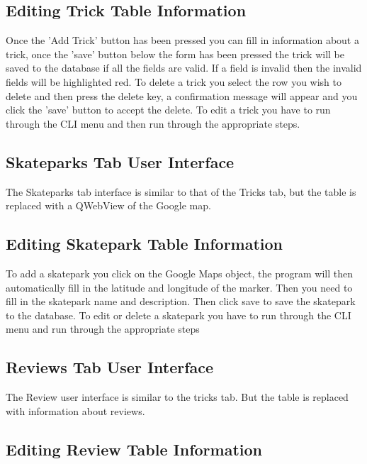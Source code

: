 \subsection{Editing Trick Table Information}

Once the 'Add Trick' button has been pressed you can fill in information about a trick, once the 'save' button below the form has been pressed the trick will be saved to the database if all the fields are valid. If a field is invalid then the invalid fields will be highlighted red. To delete a trick you select the row you wish to delete and then press the delete key, a confirmation message will appear and you click the 'save' button to accept the delete. To edit a trick you have to run through the CLI menu and then run through the appropriate steps.



\subsection{Skateparks Tab User Interface}

The Skateparks tab interface is similar to that of the Tricks tab, but the table is replaced with a QWebView of the Google map.

\subsection{Editing Skatepark Table Information}

To add a skatepark you click on the Google Maps object, the program will then automatically fill in the latitude and longitude of the marker. Then you need to fill in the skatepark name and description. Then click save to save the skatepark to the database. To edit or delete a skatepark you have to run through the CLI menu and run through the appropriate steps



\subsection{Reviews Tab User Interface}

The Review user interface is similar to the tricks tab. But the table is replaced with information about reviews.

\subsection{Editing Review Table Information}

